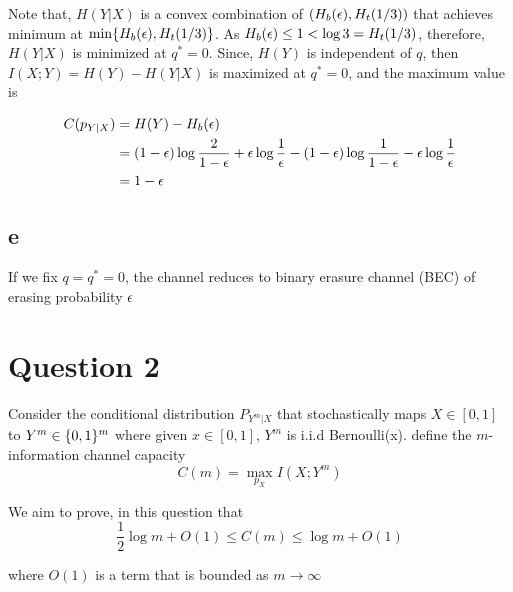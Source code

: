 \documentclass{article}
\begin{document}
Note that, $H(Y|X)$ is a convex combination of $(H_b(\epsilon), H_t(1/3))$ that achieves minimum at $\min \{H_b(\epsilon), H_t(1/3)\}$. As $H_b(\epsilon) \leq 1 < \log 3 = H_t(1/3)$, therefore, $H(Y|X)$ is minimized at $q^* = 0$. Since, $H(Y)$ is independent of $q$, then $I(X; Y) = H(Y) - H(Y|X)$ is maximized at $q^* = 0$, and the maximum value is

\begin{align*}
    C(p_{Y|X})
    &= H(Y) - H_b(\epsilon) \\
    &= (1 - \epsilon) \log \frac{2}{1-\epsilon} + \epsilon \log \frac{1}{\epsilon} - (1 - \epsilon) \log \frac{1}{1 - \epsilon} - \epsilon \log \frac{1}{\epsilon} \\
    &= 1 - \epsilon
\end{align*}

\subsection{e}

If we fix $q = q^* = 0$, the channel reduces to binary erasure channel (BEC) of erasing probability $\epsilon$

\section{Question 2}

Consider the conditional distribution $P_{Y^m | X}$ that stochastically maps $X \in [0, 1]$ to $Y^m \in \{0, 1\}^m$ where given $x \in [0, 1]$, $Y^m$ is i.i.d Bernoulli(x). define the $m$-information channel capacity
$$
    C(m) = \max_{p_X} I(X; Y^m)
$$

We aim to prove, in this question that
$$
    \frac{1}{2} \log m + O(1) \leq C(m) \leq \log m + O(1)
$$

where $O(1)$ is a term that is bounded as $m \to \infty$
\end{document}
